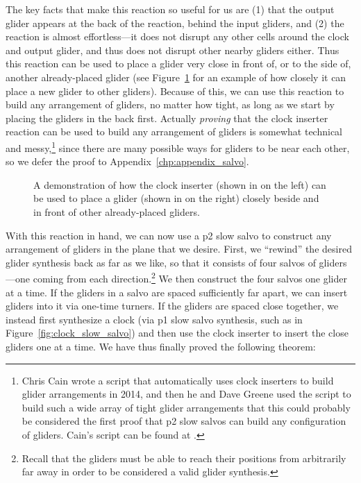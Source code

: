 The key facts that make this reaction so useful for us are (1) that the output glider appears at the back of the reaction, behind the input gliders, and (2) the reaction is almost effortless---it does not disrupt any other cells around the clock and output glider, and thus does not disrupt other nearby gliders either. Thus this reaction can be used to place a glider very close in front of, or to the side of, another already-placed glider (see Figure~\ref{fig:clock_inserter_effective} for an example of how closely it can place a new glider to other gliders). Because of this, we can use this reaction to build any arrangement of gliders, no matter how tight, as long as we start by placing the gliders in the back first. Actually \emph{proving} that the clock inserter reaction can be used to build any arrangement of gliders is somewhat technical and messy,\footnote{Chris Cain wrote a script that automatically uses clock inserters to build glider arrangements in 2014, and then he and Dave Greene used the script to build such a wide array of tight glider arrangements that this could probably be considered the first proof that p2 slow salvos can build any configuration of gliders. Cain's script can be found at .} since there are many possible ways for gliders to be near each other, so we defer the proof to Appendix~\ref{chp:appendix_salvo}.

\begin{figure}[!ht]
	\centering
	\caption{A demonstration of how the clock inserter (shown in  on the left) can be used to place a glider (shown in  on the right) closely beside and in front of other already-placed gliders.}\label{fig:clock_inserter_effective}
\end{figure}

With this reaction in hand, we can now use a p2 slow salvo to construct any arrangement of gliders in the plane that we desire. First, we ``rewind'' the desired glider synthesis back as far as we like, so that it consists of four salvos of gliders---one coming from each direction.\footnote{Recall that the gliders must be able to reach their positions from arbitrarily far away in order to be considered a valid glider synthesis.} We then construct the four salvos one glider at a time. If the gliders in a salvo are spaced sufficiently far apart, we can insert gliders into it via one-time turners. If the gliders are spaced close together, we instead first synthesize a clock (via p1 slow salvo synthesis, such as in Figure~\ref{fig:clock_slow_salvo}) and then use the clock inserter to insert the close gliders one at a time. We have thus finally proved the following theorem:

